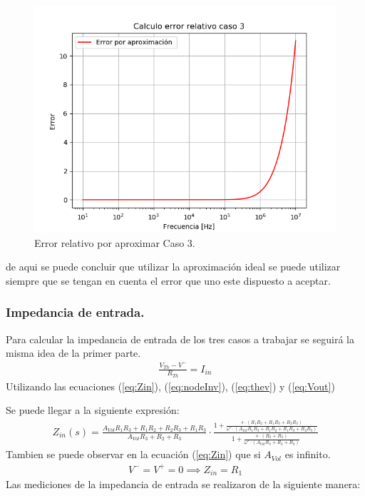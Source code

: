 \begin{figure}[H]	
	\centering
	\includegraphics[width=\textwidth]{Ejercicio1/Imagenes/error3.png}
	\caption{Error relativo por aproximar Caso 3.}
	\label{fig:e3}
\end{figure}
de aqui se puede concluir que utilizar la aproximación ideal se puede utilizar siempre que se tengan en cuenta el error que uno este dispuesto a aceptar.
\subsubsection{Impedancia de entrada.}

Para calcular la impedancia de entrada de los tres casos a trabajar se seguirá la misma idea de la primer parte.
\begin{align}
\label{eq:Zin}
\frac{V_{Th} - V^-}{R_{Th}}=I_{in}
\end{align}
Utilizando las ecuaciones (\ref{eq:Zin}), (\ref{eq:nodeInv}), (\ref{eq:thev}) y (\ref{eq:Vout})

Se puede llegar a la siguiente expresión:
\begin{align}
	Z_{in}(s)=\frac{A_{Vol}R_1R_3+R_1R_2+R_2R_3+R_1R_3}{A_{Vol}R_3+R_2+R_3}\cdot \frac{1+\frac{s\cdot (R_1R_2+R_1R_3+R_2R_3)}{\omega ' \cdot (A_{Vol}R_1R_3+R_1R_2+R_1R_3+R_2R_3)}}{1+\frac{s\cdot (R_2+R_3)}{\omega ' \cdot(A_{Vol}R_3+R_2+R_3)}}
\end{align}
Tambien se puede observar en la ecuación (\ref{eq:Zin}) que si $A_{Vol}$ es infinito.
\begin{align} V^- = V^+=0 \implies Z_{in}=R_1
\end{align}
Las mediciones de la impedancia de entrada se realizaron de la siguiente manera:

